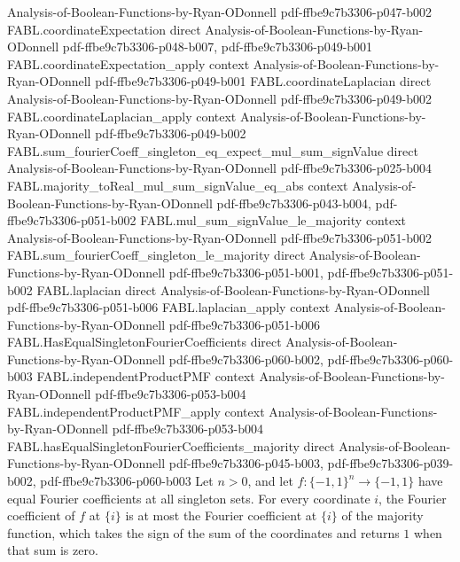 \begin{theorem}
  {Analysis-of-Boolean-Functions-by-Ryan-ODonnell}
  {pdf-ffbe9c7b3306-p047-b002}
\proofstep
  {FABL.coordinateExpectation}
  {direct}
  {Analysis-of-Boolean-Functions-by-Ryan-ODonnell}
  {pdf-ffbe9c7b3306-p048-b007,
    pdf-ffbe9c7b3306-p049-b001}
\proofstep
  {FABL.coordinateExpectation_apply}
  {context}
  {Analysis-of-Boolean-Functions-by-Ryan-ODonnell}
  {pdf-ffbe9c7b3306-p049-b001}
\proofstep
  {FABL.coordinateLaplacian}
  {direct}
  {Analysis-of-Boolean-Functions-by-Ryan-ODonnell}
  {pdf-ffbe9c7b3306-p049-b002}
\proofstep
  {FABL.coordinateLaplacian_apply}
  {context}
  {Analysis-of-Boolean-Functions-by-Ryan-ODonnell}
  {pdf-ffbe9c7b3306-p049-b002}
\proofstep
  {FABL.sum_fourierCoeff_singleton_eq_expect_mul_sum_signValue}
  {direct}
  {Analysis-of-Boolean-Functions-by-Ryan-ODonnell}
  {pdf-ffbe9c7b3306-p025-b004}
\proofstep
  {FABL.majority_toReal_mul_sum_signValue_eq_abs}
  {context}
  {Analysis-of-Boolean-Functions-by-Ryan-ODonnell}
  {pdf-ffbe9c7b3306-p043-b004,
    pdf-ffbe9c7b3306-p051-b002}
\proofstep
  {FABL.mul_sum_signValue_le_majority}
  {context}
  {Analysis-of-Boolean-Functions-by-Ryan-ODonnell}
  {pdf-ffbe9c7b3306-p051-b002}
\proofstep
  {FABL.sum_fourierCoeff_singleton_le_majority}
  {direct}
  {Analysis-of-Boolean-Functions-by-Ryan-ODonnell}
  {pdf-ffbe9c7b3306-p051-b001,
    pdf-ffbe9c7b3306-p051-b002}
\proofstep
  {FABL.laplacian}
  {direct}
  {Analysis-of-Boolean-Functions-by-Ryan-ODonnell}
  {pdf-ffbe9c7b3306-p051-b006}
\proofstep
  {FABL.laplacian_apply}
  {context}
  {Analysis-of-Boolean-Functions-by-Ryan-ODonnell}
  {pdf-ffbe9c7b3306-p051-b006}
\proofstep
  {FABL.HasEqualSingletonFourierCoefficients}
  {direct}
  {Analysis-of-Boolean-Functions-by-Ryan-ODonnell}
  {pdf-ffbe9c7b3306-p060-b002,
    pdf-ffbe9c7b3306-p060-b003}
\proofstep
  {FABL.independentProductPMF}
  {context}
  {Analysis-of-Boolean-Functions-by-Ryan-ODonnell}
  {pdf-ffbe9c7b3306-p053-b004}
\proofstep
  {FABL.independentProductPMF_apply}
  {context}
  {Analysis-of-Boolean-Functions-by-Ryan-ODonnell}
  {pdf-ffbe9c7b3306-p053-b004}
\proofstep
  {FABL.hasEqualSingletonFourierCoefficients_majority}
  {direct}
  {Analysis-of-Boolean-Functions-by-Ryan-ODonnell}
  {pdf-ffbe9c7b3306-p045-b003,
    pdf-ffbe9c7b3306-p039-b002,
    pdf-ffbe9c7b3306-p060-b003}
Let $n>0$, and let $f:\{-1,1\}^n\to\{-1,1\}$ have equal Fourier coefficients at all
singleton sets. For every coordinate $i$, the Fourier coefficient of $f$ at $\{i\}$ is
at most the Fourier coefficient at $\{i\}$ of the majority function, which takes the
sign of the sum of the coordinates and returns $1$ when that sum is zero.
\end{theorem}
